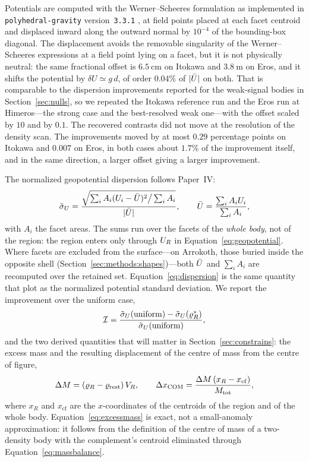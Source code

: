 Potentials are computed with the Werner--Scheeres formulation
\citep{werner1996,tsoulis2012} as implemented in
\texttt{polyhedral-gravity} version~\texttt{3.3.1}
\citep{gravitylib},
at field points placed at each facet centroid and displaced inward along
the outward normal by $10^{-4}$ of the bounding-box diagonal. The
displacement avoids the removable singularity of the Werner--Scheeres
expressions at a field point lying on a facet, but it is not physically
neutral: the same fractional offset is $\SI{6.5}{\centi\metre}$ on
Itokawa and $\SI{3.8}{\metre}$ on Eros, and it shifts the potential by
$\delta U \simeq g\,d$, of order $0.04\%$ of $\lvert\bar{U}\rvert$ on both.
That is comparable to the dispersion improvements reported for the
weak-signal bodies in Section~\ref{sec:nulls}, so we repeated the Itokawa
reference run and the Eros run at Himeros---the strong case and the
best-resolved weak one---with the offset scaled by $10$ and by $0.1$. The
recovered contrasts did not move at the resolution of the density scan. The
improvements moved by at most $0.29$ percentage points on Itokawa and
$0.007$ on Eros, in both cases about $1.7\%$ of the improvement itself, and
in the same direction, a larger offset giving a larger improvement.

The normalized geopotential dispersion follows Paper~IV:
%
\begin{equation}
\tilde{\sigma}_{U} = \frac{\sqrt{\sum_i A_i (U_i - \bar{U})^2 \big/ \sum_i A_i}}
                {\lvert \bar{U} \rvert},
\qquad
\bar{U} = \frac{\sum_i A_i U_i}{\sum_i A_i},
\label{eq:dispersion}
\end{equation}
%
with $A_i$ the facet areas. The sums run over the facets of the
\emph{whole body}, not of the region: the region enters only through
$U_{R}$ in Equation~\eqref{eq:geopotential}. Where facets are excluded from
the surface---on Arrokoth, those buried inside the opposite shell
(Section~\ref{sec:methods:shapes})---both $\bar{U}$ and $\sum_i A_i$ are
recomputed over the retained set. Equation~\eqref{eq:dispersion} is the
same quantity that \citet{richardson2014} plot as the normalized
potential standard deviation. We report the improvement over the uniform
case,
%
\begin{equation}
\mathcal{I} = \frac{\tilde{\sigma}_{U}(\text{uniform}) - \tilde{\sigma}_{U}(\varrho_{R}^{\ast})}
                {\tilde{\sigma}_{U}(\text{uniform})},
\label{eq:improvement}
\end{equation}
%
and the two derived quantities that will matter in
Section~\ref{sec:constrains}: the excess mass and the resulting
displacement of the centre of mass from the centre of figure,
%
\begin{equation}
\Delta M = (\varrho_{R} - \varrho_{\mathrm{rest}})\,V_{R} ,
\qquad
\Delta x_{\mathrm{COM}} = \frac{\Delta M\,(x_R - x_{\mathrm{cf}})}{M_{\mathrm{tot}}},
\label{eq:excessmass}
\end{equation}
%
where $x_R$ and $x_{\mathrm{cf}}$ are the $x$-coordinates of the
centroids of the region and of the whole body.
Equation~\eqref{eq:excessmass} is exact, not a small-anomaly
approximation: it follows from the definition of the centre of mass of a
two-density body with the complement's centroid eliminated through
Equation~\eqref{eq:massbalance}.

